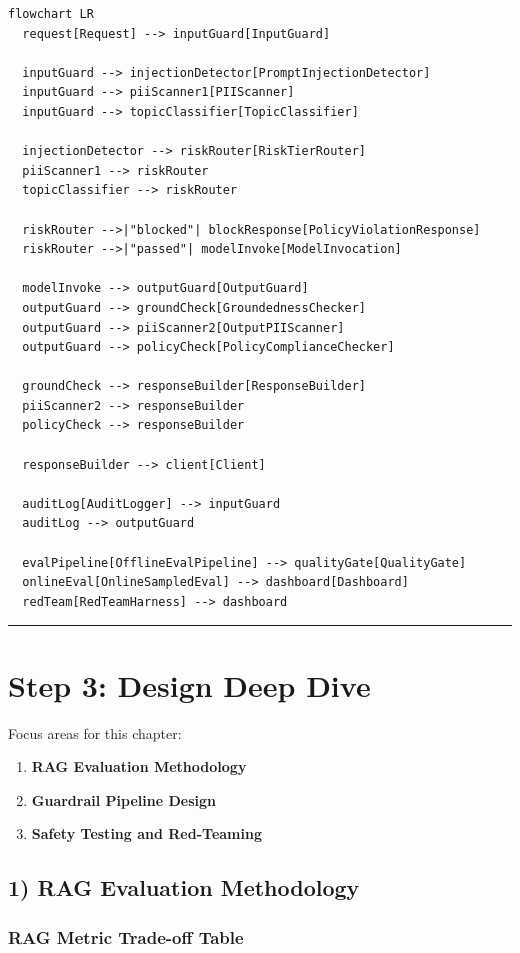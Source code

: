 \begin{verbatim}
flowchart LR
  request[Request] --> inputGuard[InputGuard]

  inputGuard --> injectionDetector[PromptInjectionDetector]
  inputGuard --> piiScanner1[PIIScanner]
  inputGuard --> topicClassifier[TopicClassifier]

  injectionDetector --> riskRouter[RiskTierRouter]
  piiScanner1 --> riskRouter
  topicClassifier --> riskRouter

  riskRouter -->|"blocked"| blockResponse[PolicyViolationResponse]
  riskRouter -->|"passed"| modelInvoke[ModelInvocation]

  modelInvoke --> outputGuard[OutputGuard]
  outputGuard --> groundCheck[GroundednessChecker]
  outputGuard --> piiScanner2[OutputPIIScanner]
  outputGuard --> policyCheck[PolicyComplianceChecker]

  groundCheck --> responseBuilder[ResponseBuilder]
  piiScanner2 --> responseBuilder
  policyCheck --> responseBuilder

  responseBuilder --> client[Client]

  auditLog[AuditLogger] --> inputGuard
  auditLog --> outputGuard

  evalPipeline[OfflineEvalPipeline] --> qualityGate[QualityGate]
  onlineEval[OnlineSampledEval] --> dashboard[Dashboard]
  redTeam[RedTeamHarness] --> dashboard
\end{verbatim}

\bigskip\hrule\bigskip

\section*{Step 3: Design Deep Dive}

Focus areas for this chapter:

\begin{enumerate}
  \item \textbf{RAG Evaluation Methodology}
  \item \textbf{Guardrail Pipeline Design}
  \item \textbf{Safety Testing and Red-Teaming}
\end{enumerate}

\subsection*{1) RAG Evaluation Methodology}

\subsubsection*{RAG Metric Trade-off Table}

